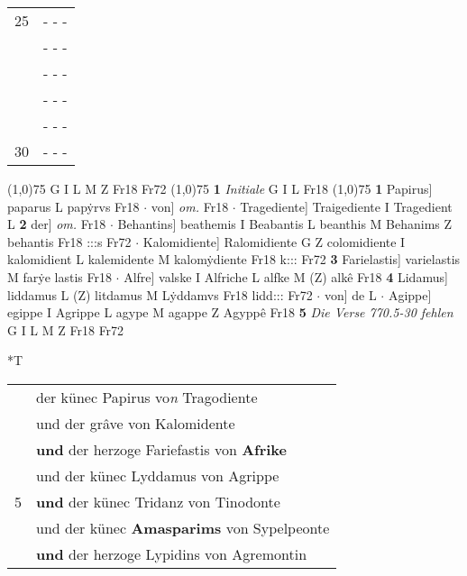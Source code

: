 \documentclass[8pt,a4paper,notitlepage]{article}
\begin{document}
\begin{table}[ht]
\begin{minipage}[t]{0.5\linewidth}
\begin{tabular}{rl}
25 & \multicolumn{1}{l}{ - - - }\\ 
 & \multicolumn{1}{l}{ - - - }\\ 
 & \multicolumn{1}{l}{ - - - }\\ 
 & \multicolumn{1}{l}{ - - - }\\ 
 & \multicolumn{1}{l}{ - - - }\\ 
30 & \multicolumn{1}{l}{ - - - }\\ 
\end{tabular}
\scriptsize
\line(1,0){75} \newline
G I L M Z Fr18 Fr72 \newline
\line(1,0){75} \newline
\textbf{1} \textit{Initiale} G I L Fr18  \newline
\line(1,0){75} \newline
\textbf{1} Papirus] paparus L papẏrvs Fr18  $\cdot$ von] \textit{om.} Fr18  $\cdot$ Tragediente] Traigediente I Tragedient L \textbf{2} der] \textit{om.} Fr18  $\cdot$ Behantins] beathemis I Beabantis L beanthis M Behanims Z behantis Fr18 :::s Fr72  $\cdot$ Kalomidiente] Ralomidiente G Z colomidiente I kalomidient L kalemidente M kalomẏdiente Fr18 k::: Fr72 \textbf{3} Farielastis] varielastis M farẏe lastis Fr18  $\cdot$ Alfre] valske I Alfriche L alfke M (Z) alkê Fr18 \textbf{4} Lidamus] liddamus L (Z) litdamus M Lẏddamvs Fr18 lidd::: Fr72  $\cdot$ von] de L  $\cdot$ Agippe] egippe I Agrippe L agype M agappe Z Agyppê Fr18 \textbf{5} \textit{Die Verse 770.5-30 fehlen} G I L M Z Fr18 Fr72  \newline
\end{minipage}
\hspace{0.5cm}
\begin{minipage}[t]{0.5\linewidth}
\small
\begin{center}*T
\end{center}
\begin{tabular}{rl}
 & der künec Papirus vo\textit{n} Tragodiente\\ 
 & und der grâve von Kalomidente\\ 
 & \textbf{und} der herzoge Fariefastis von \textbf{Afrike}\\ 
 & und der künec Lyddamus von Agrippe\\ 
5 & \textbf{und} der künec Tridanz von Tinodonte\\ 
 & und der künec \textbf{Amasparims} von Sypelpeonte\\ 
 & \textbf{und} der herzoge Lypidins von Agremontin\\ 

\end{tabular}
\end{minipage}
\end{table}
\end{document}
